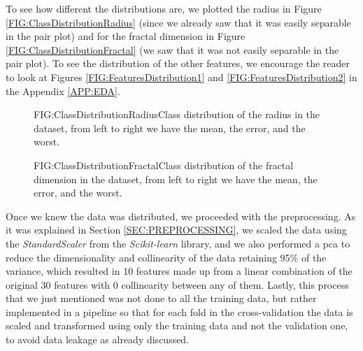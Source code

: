 To see how different the distributions are, we plotted the radius in Figure \ref{FIG:ClassDistributionRadius} (since we already saw that it was easily separable in the pair plot) and for the fractal dimension in Figure \ref{FIG:ClassDistributionFractal} (we saw that it was not easily separable in the pair plot). To see the distribution of the other features, we encourage the reader to look at Figures \ref{FIG:FeaturesDistribution1} and \ref{FIG:FeaturesDistribution2} in the Appendix \ref{APP:EDA}.


\begin{figure}[Class Distribution of the Radius]{FIG:ClassDistributionRadius}{Class distribution of the radius in the dataset, from left to right we have the mean, the error, and the worst.}
\end{figure}

\begin{figure}[Class Distribution of the Fractal Dimension]{FIG:ClassDistributionFractal}{Class distribution of the fractal dimension in the dataset, from left to right we have the mean, the error, and the worst.}
\end{figure}

Once we knew the data was distributed, we proceeded with the preprocessing. As it was explained in Section \ref{SEC:PREPROCESSING}, we scaled the data using the \textit{StandardScaler} from the \textit{Scikit-learn} library, and we also performed a \ac{pca} to reduce the dimensionality and collinearity of the data retaining 95\% of the variance, which resulted in 10 features made up from a linear combination of the original 30 features with 0 collinearity between any of them. Lastly, this process that we just mentioned was not done to all the training data, but rather implemented in a pipeline so that for each fold in the cross-validation the data is scaled and transformed using only the training data and not the validation one, to avoid data leakage as already discussed.